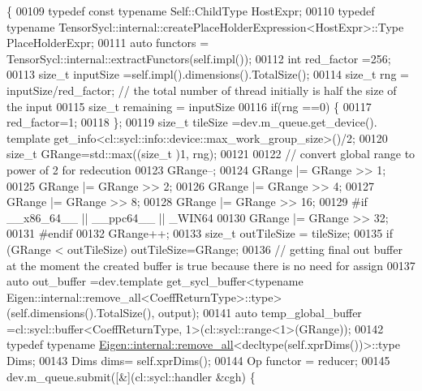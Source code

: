 \begin{DoxyCode}
      \{
00109     \textcolor{keyword}{typedef} \textcolor{keyword}{const} \textcolor{keyword}{typename} Self::ChildType HostExpr; 
00110     \textcolor{keyword}{typedef}  \textcolor{keyword}{typename} TensorSycl::internal::createPlaceHolderExpression<HostExpr>::Type PlaceHolderExpr;
00111     \textcolor{keyword}{auto} functors = TensorSycl::internal::extractFunctors(\textcolor{keyword}{self}.impl());
00112     \textcolor{keywordtype}{int} red\_factor =256; 
00113     \textcolor{keywordtype}{size\_t} inputSize =\textcolor{keyword}{self}.impl().dimensions().TotalSize();
00114     \textcolor{keywordtype}{size\_t} rng = inputSize/red\_factor; \textcolor{comment}{// the total number of thread initially is half the size of the
       input}
00115     \textcolor{keywordtype}{size\_t} remaining = inputSize%
00116     \textcolor{keywordflow}{if}(rng ==0) \{
00117       red\_factor=1;
00118     \};
00119     \textcolor{keywordtype}{size\_t} tileSize =dev.m\_queue.get\_device(). \textcolor{keyword}{template} 
      get\_info<cl::sycl::info::device::max\_work\_group\_size>()/2;
00120     \textcolor{keywordtype}{size\_t} GRange=std::max((\textcolor{keywordtype}{size\_t} )1, rng);
00121 
00122     \textcolor{comment}{// convert global range to power of 2 for redecution}
00123     GRange--;
00124     GRange |= GRange >> 1;
00125     GRange |= GRange >> 2;
00126     GRange |= GRange >> 4;
00127     GRange |= GRange >> 8;
00128     GRange |= GRange >> 16;
00129 \textcolor{preprocessor}{#if \_\_x86\_64\_\_ || \_\_ppc64\_\_ || \_WIN64}
00130     GRange |= GRange >> 32;
00131 \textcolor{preprocessor}{#endif}
00132     GRange++;
00133     \textcolor{keywordtype}{size\_t}  outTileSize = tileSize;
00135     \textcolor{keywordflow}{if} (GRange < outTileSize) outTileSize=GRange;
00136     \textcolor{comment}{// getting final out buffer at the moment the created buffer is true because there is no need for
       assign}
00137     \textcolor{keyword}{auto} out\_buffer =dev.template get\_sycl\_buffer<typename
       Eigen::internal::remove\_all<CoeffReturnType>::type>(\textcolor{keyword}{self}.dimensions().TotalSize(), output);
00141     \textcolor{keyword}{auto} temp\_global\_buffer =cl::sycl::buffer<CoeffReturnType, 1>(cl::sycl::range<1>(GRange));
00142     \textcolor{keyword}{typedef} \textcolor{keyword}{typename} \hyperlink{struct_eigen_1_1internal_1_1remove__all}{Eigen::internal::remove\_all}<decltype(\textcolor{keyword}{self}.xprDims())>::type
       Dims;
00143     Dims dims= \textcolor{keyword}{self}.xprDims();
00144     Op functor = reducer;
00145     dev.m\_queue.submit([&](cl::sycl::handler &cgh) \{

\end{DoxyCode}
